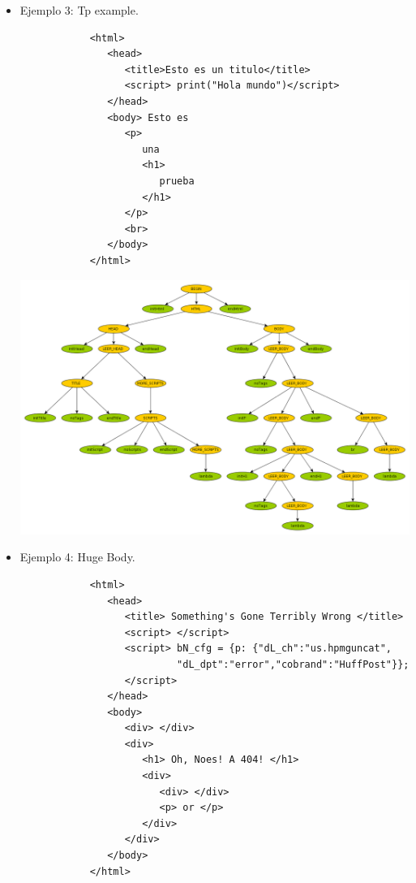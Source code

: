 \begin{itemize}
\newpage

	\item{  Ejemplo 3: Tp example.
		\begin{verbatim}
			<html>
			   <head>
			      <title>Esto es un titulo</title>
			      <script> print("Hola mundo")</script>
			   </head>
			   <body> Esto es 
			      <p>
			         una
			         <h1>
			            prueba
			         </h1>
			      </p> 
			      <br> 
			   </body>
			</html> 
		\end{verbatim}
	}

\begin{center}
	\includegraphics[scale=0.33]{Imagenes/3_tp_example.png}\\
\end{center}

\newpage

	\item{  Ejemplo 4: Huge Body.
		\begin{verbatim}
			<html>
			   <head>
			      <title> Something's Gone Terribly Wrong </title>
			      <script> </script>
			      <script> bN_cfg = {p: {"dL_ch":"us.hpmguncat",
			               "dL_dpt":"error","cobrand":"HuffPost"}};
			      </script>
			   </head>
			   <body>
			      <div> </div>
			      <div>
			         <h1> Oh, Noes! A 404! </h1>
			         <div> 
			            <div> </div> 
			            <p> or </p> 
			         </div> 
			      </div>
			   </body> 
			</html>
		\end{verbatim}

	}


\end{itemize}
